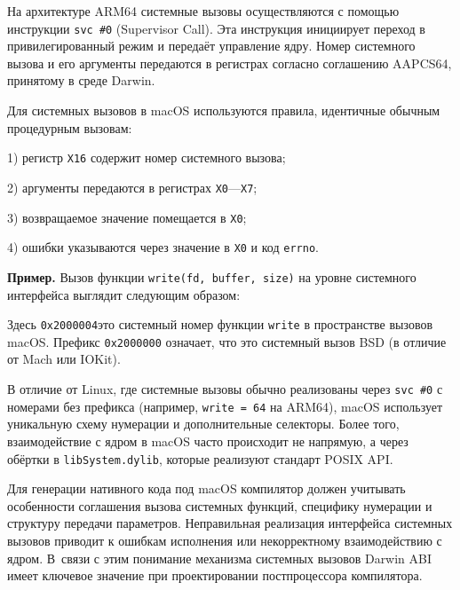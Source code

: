 \documentclass[utf8]{lgu}
\newcommand{\tire}{\unskip\nobreak\thinspace\textemdash\thinspace}
\newcommand{\code}[1]{{\normalsize\texttt{#1}}}
\begin{document}
На архитектуре ARM64 системные вызовы осуществляются с помощью инструкции \code{svc \#0} (Supervisor Call). Эта инструкция инициирует переход в привилегированный режим и передаёт управление ядру. Номер системного вызова и его аргументы передаются в регистрах согласно соглашению AAPCS64, принятому в среде Darwin.

Для системных вызовов в macOS используются правила, идентичные обычным процедурным вызовам:

1) регистр \code{X16} содержит номер системного вызова;

2) аргументы передаются в регистрах \code{X0}---\code{X7};

3) возвращаемое значение помещается в \code{X0};

4) ошибки указываются через значение в \code{X0} и код \code{errno}.

\textbf{Пример.} Вызов функции \code{write(fd, buffer, size)} на уровне системного интерфейса выглядит следующим образом:


Здесь \code{0x2000004}\tire это системный номер функции \code{write} в пространстве вызовов macOS. Префикс \code{0x2000000} означает, что это системный вызов BSD (в отличие от Mach или IOKit).

В отличие от Linux, где системные вызовы обычно реализованы через \code{svc \#0} с номерами без префикса (например, \code{write = 64} на ARM64), macOS использует уникальную схему нумерации и дополнительные селекторы. Более того, взаимодействие с ядром в macOS часто происходит не напрямую, а через обёртки в \code{libSystem.dylib}, которые реализуют стандарт POSIX API.

Для генерации нативного кода под macOS компилятор должен учитывать особенности соглашения вызова системных функций, специфику нумерации и структуру передачи параметров. Неправильная реализация интерфейса системных вызовов приводит к ошибкам исполнения или некорректному взаимодействию с ядром. В~связи с этим понимание механизма системных вызовов Darwin ABI имеет ключевое значение при проектировании постпроцессора компилятора.
\end{document}
